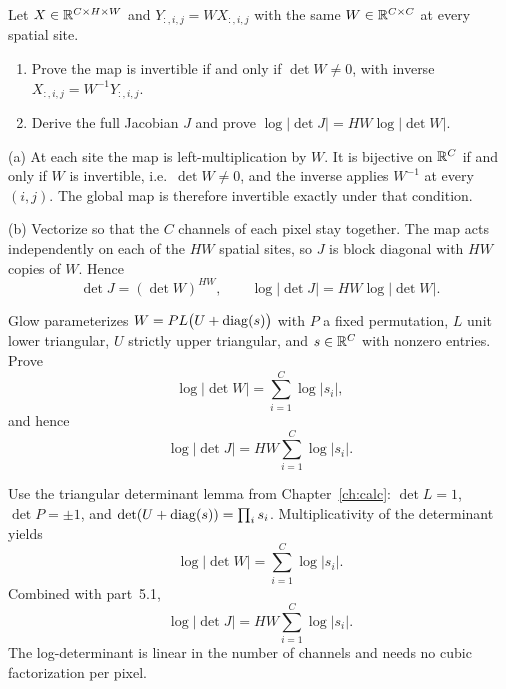 \begin{hwqbox}
Let $X\in\mathbb{R}^{C\times H\times W}$ and $Y_{:,i,j}=W X_{:,i,j}$ with the same $W\in\mathbb{R}^{C\times C}$ at every spatial site.
\begin{enumerate}[label=(\alph*)]
\item Prove the map is invertible if and only if $\det W\neq 0$, with inverse $X_{:,i,j}=W^{-1}Y_{:,i,j}$.
\item Derive the full Jacobian $J$ and prove $\log\lvert\det J\rvert=HW\log\lvert\det W\rvert$.
\end{enumerate}
\end{hwqbox}
\begin{hwsolbox}
(a) At each site the map is left-multiplication by $W$. It is bijective on $\mathbb{R}^C$ if and only if $W$ is invertible, i.e.\ $\det W\neq 0$, and the inverse applies $W^{-1}$ at every $(i,j)$. The global map is therefore invertible exactly under that condition.

(b) Vectorize so that the $C$ channels of each pixel stay together. The map acts independently on each of the $HW$ spatial sites, so $J$ is block diagonal with $HW$ copies of $W$. Hence
\[
\det J=(\det W)^{HW},\qquad
\log\lvert\det J\rvert=HW\log\lvert\det W\rvert.
\]
\end{hwsolbox}

\begin{hwqbox}
Glow parameterizes $W=PL\bigl(U+\operatorname{diag}(s)\bigr)$ with $P$ a fixed permutation, $L$ unit lower triangular, $U$ strictly upper triangular, and $s\in\mathbb{R}^C$ with nonzero entries. Prove
\[
\log\lvert\det W\rvert=\sum_{i=1}^{C}\log\lvert s_i\rvert,
\]
and hence
\[
\log\lvert\det J\rvert=HW\sum_{i=1}^{C}\log\lvert s_i\rvert.
\]
\end{hwqbox}
\begin{hwsolbox}
Use the triangular determinant lemma from Chapter~\ref{ch:calc}: $\det L=1$, $\det P=\pm 1$, and
$\det(U+\operatorname{diag}(s))=\prod_i s_i$. Multiplicativity of the determinant yields
\[
\log\lvert\det W\rvert=\sum_{i=1}^{C}\log\lvert s_i\rvert.
\]
Combined with part~5.1,
\[
\log\lvert\det J\rvert=HW\sum_{i=1}^{C}\log\lvert s_i\rvert.
\]
The log-determinant is linear in the number of channels and needs no cubic factorization per pixel.
\end{hwsolbox}
